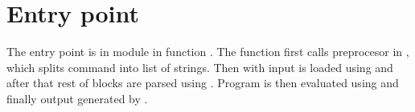 \section{Entry point}
The entry point is in module  in function . 
The function first calls preprocesor in , which splits command into list of strings. Then  with input is loaded using  and after that
rest of blocks are parsed using . Program is then evaluated using
 and finally output generated by .



